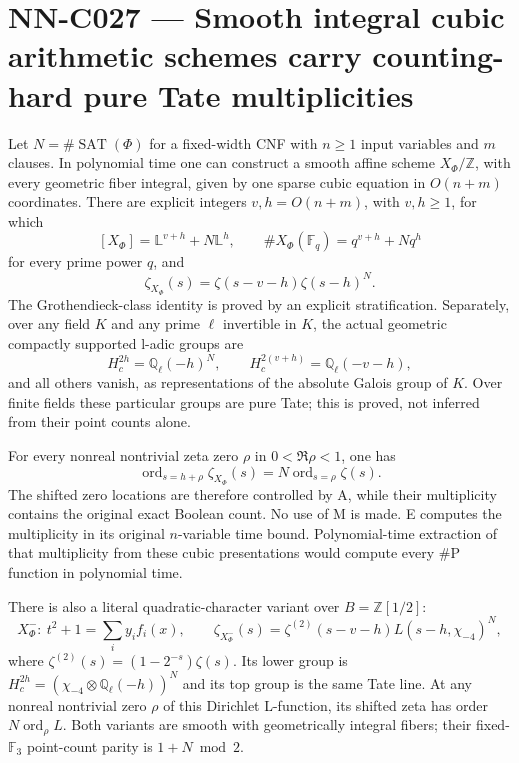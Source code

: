 \section{NN-C027 --- Smooth integral cubic arithmetic schemes carry counting-hard pure Tate multiplicities}
\begin{proposition}[NN-C027]
Let $N=\#\operatorname{SAT}(\Phi)$ for a fixed-width CNF with $n\geq1$ input variables and $m$ clauses. In polynomial time one can construct a smooth affine scheme $X_\Phi/\mathbb Z$, with every geometric fiber integral, given by one sparse cubic equation in $O(n+m)$ coordinates. There are explicit integers $v,h=O(n+m)$, with $v,h\geq1$, for which
\[
 [X_\Phi]=\mathbb L^{v+h}+N\mathbb L^h,
 \qquad
 \#X_\Phi(\mathbb F_q)=q^{v+h}+Nq^h
\]
for every prime power $q$, and
\[
         \zeta_{X_\Phi}(s)=\zeta(s-v-h)\zeta(s-h)^N.
\]
The Grothendieck-class identity is proved by an explicit stratification. Separately, over any field $K$ and any prime $\ell$ invertible in $K$, the actual geometric compactly supported l-adic groups are
\[
 H_c^{2h}=\mathbb Q_\ell(-h)^N,
 \qquad H_c^{2(v+h)}=\mathbb Q_\ell(-v-h),
\]
and all others vanish, as representations of the absolute Galois group of $K$. Over finite fields these particular groups are pure Tate; this is proved, not inferred from their point counts alone.

For every nonreal nontrivial zeta zero $\rho$ in $0<\Re\rho<1$, one has
\[
 \operatorname{ord}_{s=h+\rho}\zeta_{X_\Phi}(s)
              =N\operatorname{ord}_{s=\rho}\zeta(s).
\]
The shifted zero locations are therefore controlled by A, while their multiplicity contains the original exact Boolean count. No use of M is made. E computes the multiplicity in its original $n$-variable time bound. Polynomial-time extraction of that multiplicity from these cubic presentations would compute every $\#\mathrm P$ function in polynomial time.

There is also a literal quadratic-character variant over $B=\mathbb Z[1/2]$:
\[
 X^-_\Phi:\ t^2+1=\sum_i y_i f_i(x),\qquad
 \zeta_{X^-_\Phi}(s)=\zeta^{(2)}(s-v-h)L(s-h,\chi_{-4})^N,
\]
where $\zeta^{(2)}(s)=(1-2^{-s})\zeta(s)$. Its lower group is
$H_c^{2h}=(\chi_{-4}\otimes\mathbb Q_\ell(-h))^N$ and its top group is the same Tate line. At any nonreal nontrivial zero $\rho$ of this Dirichlet L-function, its shifted zeta has order $N\operatorname{ord}_\rho L$. Both variants are smooth with geometrically integral fibers; their fixed-$\mathbb F_3$ point-count parity is $1+N\bmod2$.
\end{proposition}
